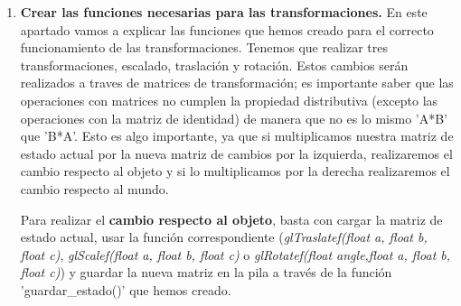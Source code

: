 \documentclass[12pt,a4paper]{article}
\begin{document}
\begin{enumerate}
\begin{lstlisting}
    case 'm':
    case 'M':
        printf("Usted acaba de activar el modo de traslacion\n");
        modo=1;
        break;
    break;

    case 26: //Control + z Tenemos que volver al estado anterior
        printf("Deshacer cambios\n");
        deshacer();
    break;
    ...
    ...
    ...
}

\end{lstlisting}





\item \textbf{Crear las funciones necesarias para las transformaciones.}\newline
En este apartado vamos a explicar las funciones que hemos creado para el correcto funcionamiento de las transformaciones. Tenemos que realizar tres transformaciones, escalado, traslación y rotación. Estos cambios serán realizados a traves de matrices de transformación; es importante saber que las operaciones con matrices no cumplen la propiedad distributiva (excepto las operaciones con la matriz de identidad) de manera que no es lo mismo 'A*B' que 'B*A'. Esto es algo importante, ya que si multiplicamos nuestra matriz de estado actual por la nueva matriz de cambios por la izquierda, realizaremos el cambio respecto al objeto y si lo multiplicamos por la derecha realizaremos el cambio respecto al mundo.\newline

Para realizar el \textbf{cambio respecto al objeto}, basta con cargar la matriz de estado actual, usar la función correspondiente (\textit{glTraslatef(float a, float b, float c)}, \textit{glScalef(float a, float b, float c)} o \textit{glRotatef(float angle,float a, float b, float c)}) y guardar la nueva matriz en la pila a través de la función 'guardar\_estado()' que hemos creado.\newline



\end{enumerate}
\end{document}
